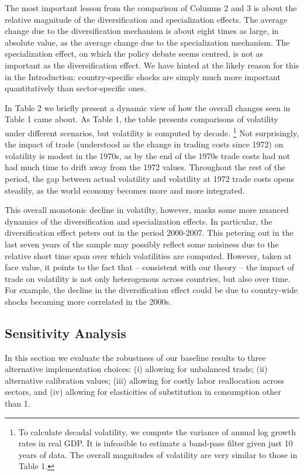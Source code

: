 \documentclass[12pt]{article}
\begin{document}
The most important lesson from the comparison of Columns 2 and 3 is about
the relative magnitude of the diversification and specialization effects.
The average change due to the diversification mechanism is about eight times
as large, in absolute value, as the average change due to the specialization mechanism. The
specialization effect, on which the policy debate seems centred, is not as
important as the diversification effect. We have hinted at the likely reason
for this in the Introduction: country-specific shocks are simply much more
important quantitatively than sector-specific ones.

In Table 2 we briefly present a dynamic view of how the overall changes seen
in Table 1 came about. As Table 1, the table presents comparisons of
volatility under different scenarios, but volatility is computed by decade.%
\footnote{%
To calculate decadal volatility, we compute the variance of annual log
growth rates in real GDP. It is infeasible to estimate a band-pass filter
given just 10 years of data. The overall magnitudes of volatility are very
similar to those in Table 1.} Not surprisingly, the impact of trade
(understood as the change in trading costs since 1972) on volatility is
modest in the 1970s, as by the end of the 1970s trade costs had not had much
time to drift away from the 1972 values. Throughout the rest of the period,
the gap between actual volatility and volatility at 1972 trade costs opens
steadily, as the world economy becomes more and more integrated.

This overall monotonic decline in volatilty, however, masks some
more nuanced dynamics of the diversification and specialization effects. In
particular, the diversification effect peters out in the period 2000-2007.
This petering out in the last seven years of the sample may possibly reflect
some noisiness due to the relative short time span over which volatilities
are computed. However, taken at face value, it points to the fact that --
consistent with our theory -- the impact of trade on volatility is not only
heterogenous across countries, but also over time. For example, the decline
in the diversification effect could be due to country-wide shocks becaming
more correlated in the 2000s.

\subsection{Sensitivity Analysis}

In this section we evaluate the robustness of our baseline results to three
alternative implementation choices: (i) allowing for unbalanced trade; (ii)
alternative calibration values; (iii) allowing for costly labor reallocation
across sectors, and (iv) allowing for elasticities of substitution
in consumption other than 1.
\end{document}
